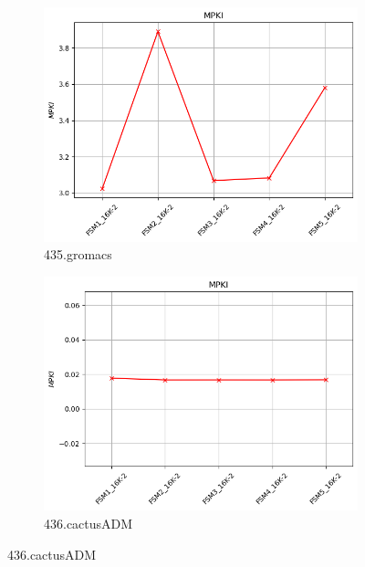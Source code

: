 \documentclass{article}
\begin{document}
 \begin{figure}[H]
     \ContinuedFloat
     \centering
 
     \begin{subfigure}[b]{0.45\textwidth}
         \includegraphics[width=\textwidth]{figures/5_3_b/435.gromacs.cslab_branch_preds_ref.out.png}
         \caption{435.gromacs}
         \label{fig:plot23}
     \end{subfigure}
     \hfill
     \begin{subfigure}[b]{0.45\textwidth}
         \includegraphics[width=\textwidth]{figures/5_3_b/436.cactusADM.cslab_branch_preds_ref.out.png}
         \caption{436.cactusADM}
         \label{fig:plot24}
     \end{subfigure}
 

\end{figure}
\end{document}
